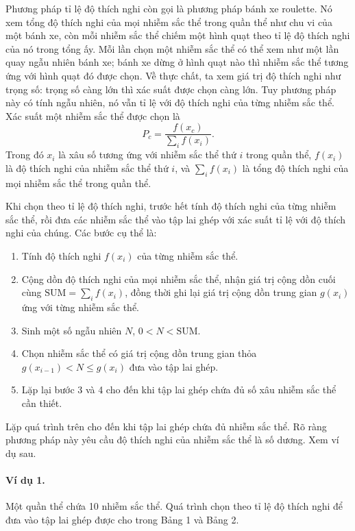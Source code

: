 \documentclass[11pt]{article}
\begin{document}
Phương pháp tỉ lệ độ thích nghi còn gọi là phương pháp bánh xe roulette. Nó
xem tổng độ thích nghi của mọi nhiễm sắc thể trong quần thể như chu vi của
một bánh xe, còn mỗi nhiễm sắc thể chiếm một hình quạt theo tỉ lệ độ thích
nghi của nó trong tổng ấy. Mỗi lần chọn một nhiễm sắc thể có thể xem như một
lần quay ngẫu nhiên bánh xe; bánh xe dừng ở hình quạt nào thì nhiễm sắc thể
tương ứng với hình quạt đó được chọn. Về thực chất, ta xem giá trị độ thích
nghi như trọng số: trọng số càng lớn thì xác suất được chọn càng lớn. Tuy
phương pháp này có tính ngẫu nhiên, nó vẫn tỉ lệ với độ thích nghi của từng
nhiễm sắc thể. Xác suất một nhiễm sắc thể được chọn là
\[
  P_c=\frac{f(x_c)}{\sum_i f(x_i)}.
\]
Trong đó \(x_i\) là xâu số tương ứng với nhiễm sắc thể thứ \(i\) trong quần
thể, \(f(x_i)\) là độ thích nghi của nhiễm sắc thể thứ \(i\), và
\(\sum_i f(x_i)\) là tổng độ thích nghi của mọi nhiễm sắc thể trong quần thể.

Khi chọn theo tỉ lệ độ thích nghi, trước hết tính độ thích nghi của từng
nhiễm sắc thể, rồi đưa các nhiễm sắc thể vào tập lai ghép với xác suất tỉ lệ
với độ thích nghi của chúng. Các bước cụ thể là:
\begin{enumerate}
  \item Tính độ thích nghi \(f(x_i)\) của từng nhiễm sắc thể.
  \item Cộng dồn độ thích nghi của mọi nhiễm sắc thể, nhận giá trị cộng dồn
  cuối cùng \(\mathrm{SUM}=\sum_i f(x_i)\), đồng thời ghi lại giá trị cộng
  dồn trung gian \(g(x_i)\) ứng với từng nhiễm sắc thể.
  \item Sinh một số ngẫu nhiên \(N\), \(0<N<\mathrm{SUM}\).
  \item Chọn nhiễm sắc thể có giá trị cộng dồn trung gian thỏa
  \(g(x_{i-1})<N\le g(x_i)\) đưa vào tập lai ghép.
  \item Lặp lại bước 3 và 4 cho đến khi tập lai ghép chứa đủ số xâu nhiễm
  sắc thể cần thiết.
\end{enumerate}

Lặp quá trình trên cho đến khi tập lai ghép chứa đủ nhiễm sắc thể. Rõ ràng
phương pháp này yêu cầu độ thích nghi của nhiễm sắc thể là số dương. Xem ví
dụ sau.

\paragraph{Ví dụ 1.}
Một quần thể chứa 10 nhiễm sắc thể. Quá trình chọn theo tỉ lệ độ thích nghi
để đưa vào tập lai ghép được cho trong Bảng 1 và Bảng 2.
\end{document}

